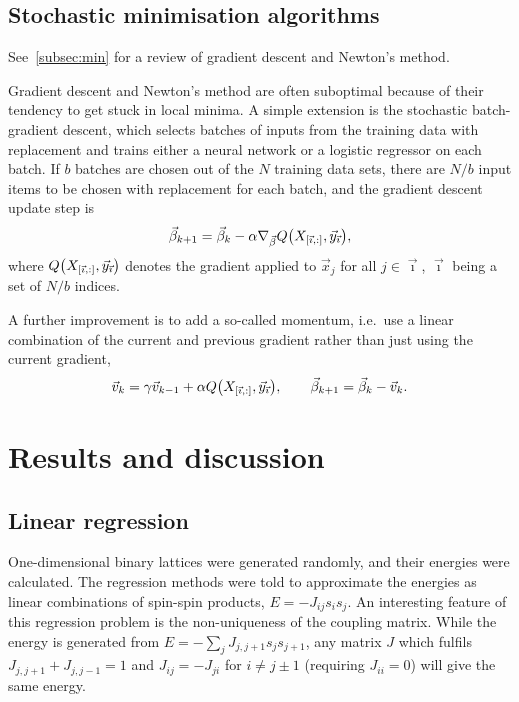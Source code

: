 \documentclass[11pt,british,a4paper]{article}
\numberwithin{equation}{section}
\begin{document}
\subsection{Stochastic minimisation algorithms}
See~\vref{subsec:min} for a review of gradient descent and Newton's method.

Gradient descent and Newton's method are often suboptimal because of their tendency to get stuck in local minima.
A simple extension is the stochastic batch-gradient descent, which selects batches of inputs from the training data with replacement and trains either a neural network or a logistic regressor on each batch. If \(b\) batches are chosen out of the \(N\) training data sets, there are \(N/b\) input items to be chosen with replacement for each batch, and the gradient descent update step is
\begin{equation}
    \vec{\beta}_{k+1} = \vec{\beta}_k - \alpha \nabla_{\vec{\beta}} Q\qty(X_{\qty[\vec{\imath},:]},\vec{y}_{\vec{\imath}}),
\end{equation}
where \(Q\qty(X_{\qty[\vec{\imath},:]},\vec{y}_{\vec{\imath}})\) denotes the gradient applied to \(\vec{x}_j\) for all \(j\in\vec{\imath}\), \(\vec{\imath}\) being a set of \(N/b\) indices.

A further improvement is to add a so-called momentum, i.e.\ use a linear combination of the current and previous gradient rather than just using the current gradient,
\begin{equation}
    \vec{v}_{k} = \gamma \vec{v}_{k-1} + \alpha Q\qty(X_{\qty[\vec{\imath},:]},\vec{y}_{\vec{\imath}}), \qquad
    \vec{\beta}_{k+1} = \vec{\beta}_k - \vec{v}_k.
\end{equation}

\section{Results and discussion}
\subsection{Linear regression}\label{subsec:linregresults}
One-dimensional binary lattices were generated randomly, and their energies were calculated.
The regression methods were told to approximate the energies as linear combinations of spin-spin products, \(E=-J_{ij}s_i s_j\).
An interesting feature of this regression problem is the non-uniqueness of the coupling matrix.
While the energy is generated from \(E=-\sum_j J_{j,j+1}s_j s_{j+1}\), any matrix \(J\) which fulfils \(J_{j,j+1} + J_{j,j-1}=1\) and \(J_{ij} = -J_{ji}\) for \(i\neq j\pm1\) (requiring \(J_{ii}=0\)) will give the same energy.
\end{document}

